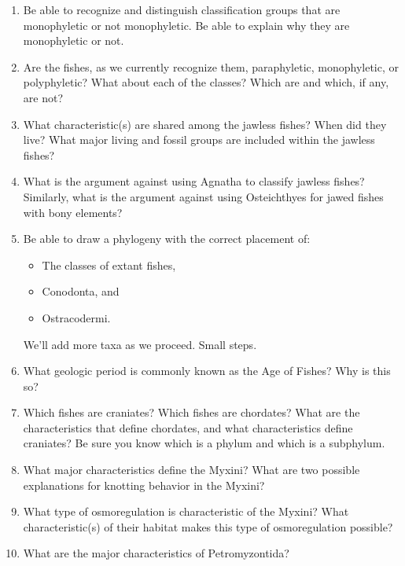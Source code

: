 \documentclass[nofonts, letterpaper]{tufte-handout}
\begin{document}
\begin{enumerate}
	\item Be able to recognize and distinguish classification groups that are monophyletic or not monophyletic.  Be able to explain why they are monophyletic or not.

	\item Are the fishes, as we currently recognize them, paraphyletic, monophyletic, or polyphyletic?  What about each of the classes? Which are and which, if any, are not?

	\item What characteristic(s) are shared among the jawless fishes?  When did they live? What major living and fossil groups are included within the jawless fishes?

	\item What is the argument against using Agnatha to classify jawless fishes?  Similarly, what is the argument against using Osteichthyes for jawed fishes with bony elements?

	\item Be able to draw a phylogeny with the correct placement of:
	\begin{itemize}
		\item The classes of extant fishes,
		\item Conodonta, and
		\item Ostracodermi.
	\end{itemize}
	We’ll add more taxa as we proceed.  Small steps.
	
	\item What geologic period is commonly known as the Age of Fishes?  Why is this so?

	\item Which fishes are craniates?  Which fishes are chordates?  What are the characteristics that define chordates, and what characteristics define craniates?  Be sure you know which is a phylum and which is a subphylum.
	
		\item What major characteristics define the Myxini?  What are two possible explanations for knotting behavior in the Myxini?

	\item What type of osmoregulation is characteristic of the Myxini?  What characteristic(s) of their habitat makes this type of osmoregulation possible?

	\item What are the major characteristics of Petromyzontida?


\end{enumerate}
\end{document}
